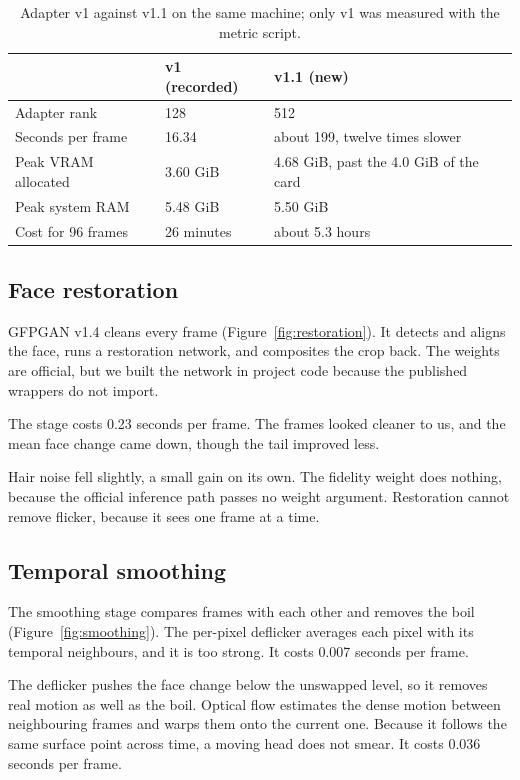 \begin{table}[tb]
  \centering
  \footnotesize
  \begin{tabular}{@{}l l l@{}}
    \toprule
    & v1 (recorded) & v1.1 (new) \\
    \midrule
    Adapter rank & 128 & 512 \\
    Seconds per frame & 16.34 & about 199, twelve times slower \\
    Peak VRAM allocated & 3.60 GiB & 4.68 GiB, past the 4.0 GiB of the card \\
    Peak system RAM & 5.48 GiB & 5.50 GiB \\
    Cost for 96 frames & 26 minutes & about 5.3 hours \\
    \bottomrule
  \end{tabular}
  \caption{Adapter v1 against v1.1 on the same machine; only v1 was measured with the metric script.}
  \label{tab:adapters}
\end{table}


\subsection{Face restoration}
GFPGAN v1.4 cleans every frame (Figure~\ref{fig:restoration}). It detects and aligns the face, runs a restoration network, and composites the crop back. The weights are official, but we built the network in project code because the published wrappers do not import.

The stage costs 0.23 seconds per frame. The frames looked cleaner to us, and the mean face change came down, though the tail improved less.

Hair noise fell slightly, a small gain on its own. The fidelity weight does nothing, because the official inference path passes no weight argument. Restoration cannot remove flicker, because it sees one frame at a time.


\subsection{Temporal smoothing}
The smoothing stage compares frames with each other and removes the boil (Figure~\ref{fig:smoothing}). The per-pixel deflicker averages each pixel with its temporal neighbours, and it is too strong. It costs 0.007 seconds per frame.

The deflicker pushes the face change below the unswapped level, so it removes real motion as well as the boil. Optical flow estimates the dense motion between neighbouring frames and warps them onto the current one. Because it follows the same surface point across time, a moving head does not smear. It costs 0.036 seconds per frame.


